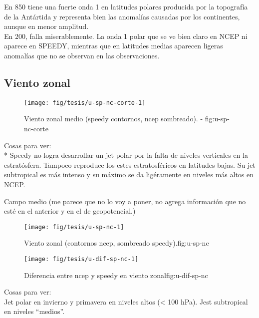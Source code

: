 \documentclass[spanish,a4paper]{book}
\begin{document}
En 850 tiene una fuerte onda 1 en latitudes polares producida por la
topografía de la Antártida y representa bien las anomalías causadas por
los continentes, aunque en menor amplitud.\\
En 200, falla miserablemente. La onda 1 polar que se ve bien claro en
NCEP ni aparece en SPEEDY, mientras que en latitudes medias aparecen
ligeras anomalías que no se observan en las observaciones.

\subsection{Viento zonal}\label{viento-zonal-1}

\begin{figure}

{\centering \texttt{[image: fig/tesis/u-sp-nc-corte-1]} 

}

\caption{Viento zonal medio (speedy contornos, ncep sombreado). - fig:u-sp-nc-corte}\label{fig:u-sp-nc-corte}
\end{figure}

Cosas para ver:\\
* Speedy no logra desarrollar un jet polar por la falta de niveles
verticales en la estratósfera. Tampoco reproduce los estes
estratosféricos en latitudes bajas. Su jet subtropical es más intenso y
su máximo se da ligéramente en niveles más altos en NCEP.

Campo medio (me parece que no lo voy a poner, no agrega información que
no esté en el anterior y en el de geopotencial.)

\begin{figure}

{\centering \texttt{[image: fig/tesis/u-sp-nc-1]} 

}

\caption{Viento zonal (contornos ncep, sombreado speedy).{fig:u-sp-nc}}\label{fig:u-sp-nc}
\end{figure}

\begin{figure}
\texttt{[image: fig/tesis/u-dif-sp-nc-1]} \caption{Diferencia entre ncep y speedy en viento zonal{fig:u-dif-sp-nc}}\label{fig:u-dif-sp-nc}
\end{figure}

Cosas para ver:\\
Jet polar en invierno y primavera en niveles altos (\textless{} 100
hPa). Jest subtropical en niveles ``medios''.
\end{document}

